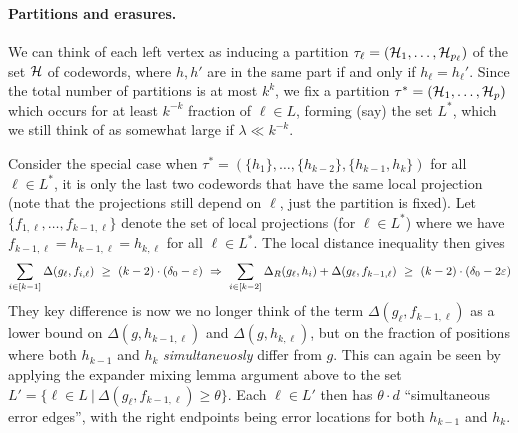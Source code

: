 \vspace{-5 pt}
\paragraph{Partitions and erasures.} 
%
We can think of each left vertex as inducing a partition $\tau_{\ell} =
({\mathcal H}_{1}, \ldots, {\mathcal H}_{p_{\ell}})$ of the set ${\mathcal H}$ of codewords, where $h, h'$ are in the
same part if and only if $h_{\ell} = h_{\ell}'$.
%
Since the total number of partitions is at most $k^k$, we fix a
partition $\tau^* = ({\mathcal H}_{1}, \ldots, {\mathcal H}_{p})$ which occurs for at least $k^{-k}$ fraction of
$\ell \in L$, forming (say) the set $L^*$, which we still think of as somewhat large if
$\lambda \ll k^{-k}$.

Consider the special case when $\tau^* = (\{h_1\}, \ldots, \{h_{k-2}\}, \{h_{k-1}, h_k\})$ \ie
for all $\ell \in L^*$, it is only the last two codewords that have the same local projection (note
that the projections still depend on $\ell$, just the partition is fixed).
%
Let $\{f_{1,\ell}, \ldots, f_{k-1, \ell}\}$ denote the set of local projections (for $\ell \in L^*$)
where we have $f_{k-1, \ell} = h_{k-1,\ell} = h_{k,\ell}$ for all $\ell \in L^*$.
%
The local distance inequality then gives 
\[
\sum_{i \in [k-1]} \Delta(g_{\ell}, f_{i,\ell}) ~\geq~ (k-2) \cdot (\delta_0 - \varepsilon)
~\Rightarrow~
\sum_{i \in [k-2]} \Delta_R(g_{\ell},h_{i}) + \Delta(g_{\ell}, f_{k-1, \ell}) ~\geq~ (k-2) \cdot
(\delta_0 - 2\varepsilon)
\]
%
They key difference is now we no longer think of the term $\Delta(g_{\ell},f_{k-1,\ell})$ as a lower bound
on $\Delta(g,h_{k-1, \ell})$ and $\Delta(g,h_{k,\ell})$, but on the fraction of positions where both
$h_{k-1}$ and $h_k$ \emph{simultaneuosly} differ from $g$.
%
This can again be seen by applying the expander mixing lemma argument above to the set 
$L' = \{\ell \in L ~|~ \Delta(g_{\ell}, f_{k-1, \ell}) \geq \theta\}$. 
%
Each $\ell \in L'$ then has $\theta \cdot d$
``simultaneous error edges'',  with the right endpoints being error locations for both $h_{k-1}$ and $h_{k}$.
%

